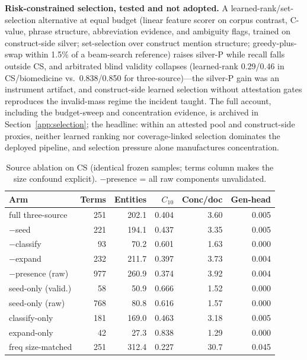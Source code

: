 \documentclass[preprint,12pt]{elsarticle}
\begin{document}
\textbf{Risk-constrained selection, tested and not adopted.} A
learned-rank/set-selection alternative at equal budget (linear
feature scorer on corpus contrast, C-value, phrase structure,
abbreviation evidence, and ambiguity flags, trained on construct-side
silver; set-selection over construct mention structure;
greedy-plus-swap within 1.5\% of a beam-search reference) raises
silver-P while recall falls outside CS, and arbitrated blind validity
collapses (learned-rank 0.29/0.46 in CS/biomedicine vs.\
0.838/0.850 for three-source)---the silver-P gain was an instrument
artifact, and construct-side learned selection without attestation
gates reproduces the invalid-mass regime the incident taught. The
full account, including the budget-sweep and concentration evidence,
is archived in Section~\ref{app:selection}; the headline: within an
attested pool and construct-side proxies, neither learned ranking nor
coverage-linked selection dominates the deployed pipeline, and
selection pressure alone manufactures concentration.

\begin{table}[t]
\centering
\caption{Source ablation on CS (identical frozen samples; terms column
makes the size confound explicit). $-$presence = all raw components
unvalidated.}
\label{tab:xdablate}
\small
\begin{tabular}{@{}lrrrrr@{}}
\toprule
Arm & Terms & Entities & $C_{10}$ & Conc/doc & Gen-head \\
\midrule
full three-source & 251 & 202.1 & 0.404 & 3.60 & 0.005 \\
$-$seed & 221 & 194.1 & 0.437 & 3.35 & 0.005 \\
$-$classify & 93 & 70.2 & 0.601 & 1.63 & 0.000 \\
$-$expand & 232 & 211.7 & 0.397 & 3.73 & 0.004 \\
$-$presence (raw) & 977 & 260.9 & 0.374 & 3.92 & 0.004 \\
seed-only (valid.) & 58 & 50.9 & 0.666 & 1.52 & 0.000 \\
seed-only (raw) & 768 & 80.8 & 0.616 & 1.57 & 0.000 \\
classify-only & 181 & 169.0 & 0.463 & 3.18 & 0.005 \\
expand-only & 42 & 27.3 & 0.838 & 1.29 & 0.000 \\
freq size-matched & 251 & 312.4 & 0.227 & 30.7 & 0.045 \\
\bottomrule
\end{tabular}
\end{table}
\end{document}
